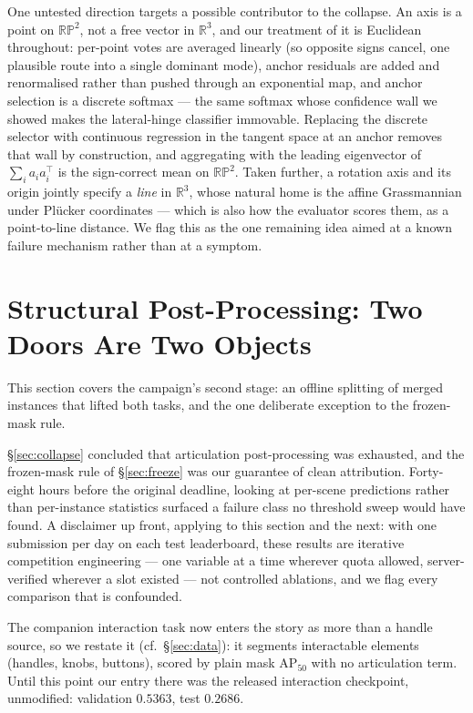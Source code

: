 \documentclass[11pt]{article}
\newcommand{\apfifty}{AP$_{50}$}
\begin{document}
One untested direction targets a possible contributor to the collapse. An
axis is a point on $\mathbb{RP}^2$, not a free vector in $\mathbb{R}^3$, and
our treatment of it is Euclidean throughout: per-point votes are averaged
linearly (so opposite signs cancel, one plausible route into a single
dominant mode), anchor residuals are added and renormalised rather than
pushed through an exponential map, and anchor selection is a discrete
softmax --- the same softmax whose confidence wall we showed makes the
lateral-hinge classifier immovable. Replacing the discrete selector with
continuous regression in the tangent space at an anchor removes that wall by
construction, and aggregating with the leading eigenvector of
$\sum_i a_i a_i^{\!\top}$ is the sign-correct mean on $\mathbb{RP}^2$. Taken
further, a rotation axis and its origin jointly specify a \emph{line} in $\mathbb{R}^3$,
whose natural home is the affine Grassmannian under Plücker coordinates ---
which is also how the evaluator scores them, as a point-to-line distance. We
flag this as the one remaining idea aimed at a known failure mechanism
rather than at a symptom.

\section{Structural Post-Processing: Two Doors Are Two Objects}
\label{sec:structural}

This section covers the campaign's second stage: an offline splitting of
merged instances that lifted both tasks, and the one deliberate exception to
the frozen-mask rule.

\S\ref{sec:collapse} concluded that articulation post-processing was
exhausted, and the frozen-mask rule of \S\ref{sec:freeze} was our guarantee
of clean attribution. Forty-eight hours before the original deadline,
looking at per-scene predictions rather than per-instance statistics
surfaced a failure class no threshold sweep would have found. A disclaimer
up front,
applying to this section and the next: with one submission per day on each
test leaderboard, these results are iterative competition engineering ---
one variable at a time wherever quota allowed, server-verified wherever a
slot existed --- not controlled ablations, and we flag every comparison that
is confounded.

The companion interaction task now enters the story as more than a handle
source, so we restate it (cf.\ \S\ref{sec:data}): it segments interactable
elements (handles, knobs, buttons), scored by plain mask \apfifty{} with no
articulation term. Until this point our entry there was the released
interaction checkpoint, unmodified: validation $0.5363$, test $0.2686$.
\end{document}
